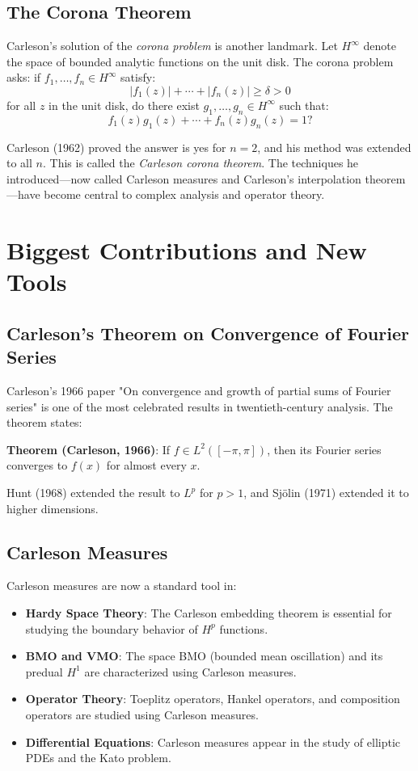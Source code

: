 \subsection{The Corona Theorem}

Carleson's solution of the \emph{corona problem} is another landmark. Let $H^\infty$ denote the space of bounded analytic functions on the unit disk. The corona problem asks: if $f_1, \ldots, f_n \in H^\infty$ satisfy:
\[
|f_1(z)| + \cdots + |f_n(z)| \geq \delta > 0
\]
for all $z$ in the unit disk, do there exist $g_1, \ldots, g_n \in H^\infty$ such that:
\[
f_1(z)g_1(z) + \cdots + f_n(z)g_n(z) = 1?
\]

Carleson (1962) proved the answer is yes for $n=2$, and his method was extended to all $n$. This is called the \emph{Carleson corona theorem}. The techniques he introduced---now called Carleson measures and Carleson's interpolation theorem---have become central to complex analysis and operator theory.

\section{Biggest Contributions and New Tools}

\subsection{Carleson's Theorem on Convergence of Fourier Series}

Carleson's 1966 paper "On convergence and growth of partial sums of Fourier series" is one of the most celebrated results in twentieth-century analysis. The theorem states:

\textbf{Theorem (Carleson, 1966)}: If $f \in L^2([-\pi, \pi])$, then its Fourier series converges to $f(x)$ for almost every $x$.

Hunt (1968) extended the result to $L^p$ for $p > 1$, and Sj\"olin (1971) extended it to higher dimensions.

\subsection{Carleson Measures}

Carleson measures are now a standard tool in:

\begin{itemize}
\item \textbf{Hardy Space Theory}: The Carleson embedding theorem is essential for studying the boundary behavior of $H^p$ functions.

\item \textbf{BMO and VMO}: The space BMO (bounded mean oscillation) and its predual $H^1$ are characterized using Carleson measures.

\item \textbf{Operator Theory}: Toeplitz operators, Hankel operators, and composition operators are studied using Carleson measures.

\item \textbf{Differential Equations}: Carleson measures appear in the study of elliptic PDEs and the Kato problem.
\end{itemize}

